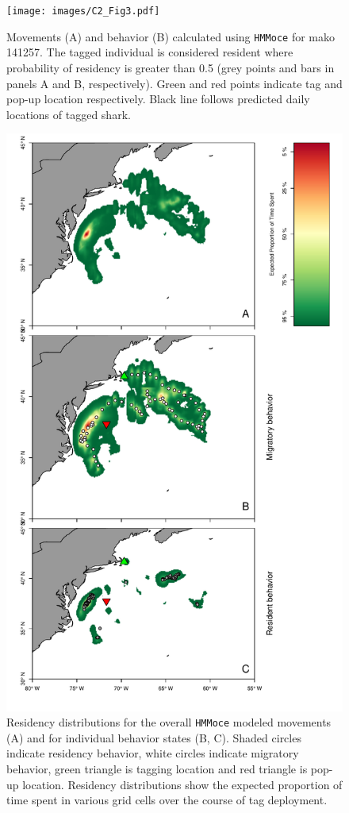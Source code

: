 \begin{figure}[p!]
\centering
\texttt{[image: images/C2\_Fig3.pdf]}
\caption[Movement and behavior results from HMMoce]{Movements (A) and behavior (B) calculated using
\texttt{HMMoce} for mako 141257. The tagged individual is considered
resident where probability of residency is greater than 0.5 (grey points
and bars in panels A and B, respectively). Green and red points indicate
tag and pop-up location respectively. Black line follows predicted daily
locations of tagged shark.}
\label{fig:c2f3}
\end{figure}

\begin{figure}[p!]
\centering
\includegraphics[width=.8\textwidth]{images/C2_Fig4.pdf}
\caption[Residency distribution results from HMMoce]{Residency distributions for the overall \texttt{HMMoce}
modeled movements (A) and for individual behavior states (B, C). Shaded
circles indicate residency behavior, white circles indicate migratory
behavior, green triangle is tagging location and red triangle is pop-up
location. Residency distributions show the expected proportion of time
spent in various grid cells over the course of tag deployment.}
\label{fig:c2f4}
\end{figure}



